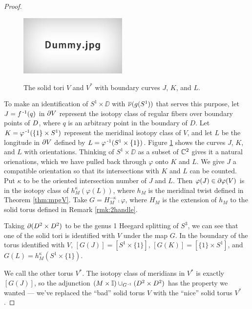 \begin{proof}
	\begin{figure}
		\centering
		\captionsetup{justification=centering}
		\caption{The solid tori $V$ and $V^*$ with boundary curves $J$, $K$, and $L$.}
		\includegraphics[height=3cm]{figures/dummy.jpg}
		\label{fig:VV*}
	\end{figure}
	
	To make an identification of $S^1\times\DD$ with $\overline{\nu}(g(S^1))$ that serves this purpose, let $J=f^{\,\text{-}1}(q)$ in $\partial V$ represent the isotopy class of regular fibers over boundary points of $D$, where $q$ is an arbitrary point in the boundary of $D$.
	Let $K=\varphi^{\,\text{-}1}(\{1\}\times S^1)$ represent the meridinal isotopy class of $V$, and let $L$ be the longitude in $\partial V$ defined by $L=\varphi^{\,\text{-}1}(S^1\times\{1\})$.
	Figure \ref{fig:VV*} shows the curves $J$, $K$, and $L$ with orientations.
	Thinking of $S^1\times\DD$ as a subset of $\mathbb{C}^2$ gives it a natural orienations, which we have pulled back through $\varphi$ onto $K$ and $L$.
	We give $J$ a compatible orientation so that its intersections with $K$ and $L$ can be counted.
	Put $\kappa$ to be the oriented intersection number of $J$ and $L$.
	Then $\varphi(J)\in \partial\varphi(V)$ is in the isotopy class of $h_M^{\kappa}(\varphi(L))$, where $h_M$ is the meridinal twist defined in Theorem \ref{thm:mpgV}.
	Take $G=H_M^{-\kappa}\comp\varphi$, where $H_M$ is the extension of $h_M$ to the solid torus defined in Remark \ref{rmk:2handle}.
	
	Taking $\partial (D^2\times D^2)$ to be the genus 1 Heegard splitting of $S^3$, we can see that one of the solid tori is identified with $V$ under the map $G$.
	In the boundary of the torus identified with $V$, $[G(J)]=[S^1\times\{1\}]$, $[G(K)]=[\{1\}\times S^1]$, and $G(L)=h_M^\kappa(S^1\times\{1\})$.
	
	We call the other torus $V^*$.
	The isotopy class of meridians in $V^*$ is exactly $[G(J)]$, so the adjunction $(M\times\mathbb{I})\cup_{G^{\,\text{-}1}}(D^2\times D^2)$ has the property we wanted --- we've replaced the ``bad'' solid torus $V$ with the ``nice'' solid torus $V^*$.
		

\end{proof}
